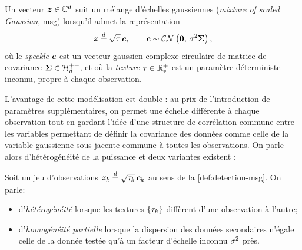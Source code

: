 \begin{definition}
\label{def:detection-msg}
  Un vecteur $\boldsymbol{z}\in\mathbb{C}^{d}$ suit un mélange d'échelles gaussiennes (\emph{mixture of scaled Gaussian}, msg) lorsqu'il admet la représentation
  \begin{equation}
    \boldsymbol{z} \overset{d}{=} \sqrt{\tau}\,\boldsymbol{c},
    \qquad
    \boldsymbol{c}\sim\mathcal{CN}\left(\boldsymbol{0},\,\sigma^2\boldsymbol{\Sigma}\right),
    \label{eq:detection-msg-modele}
  \end{equation}
  où le \emph{speckle} $\boldsymbol{c}$ est un vecteur gaussien complexe circulaire de matrice de covariance $\boldsymbol{\Sigma}\in\mathcal{H}_{d}^{++}$, et où la \emph{texture} $\tau\in\mathbb{R}_*^+$ est un paramètre déterministe inconnu, propre à chaque observation.
\end{definition}

L'avantage de cette modélisation est double : au prix de l'introduction de paramètres supplémentaires, on permet une échelle différente à chaque observation tout en gardant l'idée d'une structure de corrélation commune entre les variables permettant de définir la covariance des données comme celle de la variable gaussienne sous-jacente commune à toutes les observations. On parle alors d'hétérogénéité de la puissance et deux variantes existent :


\begin{definition}
\label{def:detection-heterogeneite}
  Soit un jeu d'observations $\boldsymbol{z}_k\overset{d}{=}\sqrt{\tau_k}\,\boldsymbol{c}_k$ au sens de la \cref{def:detection-msg}. On parle:
  \begin{itemize}
    \item d'\emph{hétérogénéité} lorsque les textures $\{\tau_k\}$ diffèrent d'une observation à l'autre;
    \item d'\emph{homogénéité partielle} lorsque la dispersion des données secondaires n'égale celle de la donnée testée qu'à un facteur d'échelle inconnu $\sigma^2$ près.
  \end{itemize}
\end{definition}


